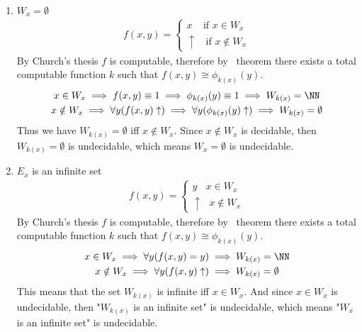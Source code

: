 \begin{enumerate}[label=\arabic*.]
    \item $W_x = \emptyset$
        \begin{gather*}
            f(x, y) = \begin{cases}
                x \ \ \ \ \ \text{if } x \in W_x \\
                \uparrow \ \ \ \ \text{if } x \notin W_x
            \end{cases}
        \end{gather*}
        By Church's thesis $f$ is computable, therefore by \smn\ theorem there exists a total computable function $k$ such that $f(x, y) \cong \phi_{k(x)}(y)$.
        \begin{gather*}
            x \in W_x \implies f(x, y) \equiv 1 \implies \phi_{k(x)}(y) \equiv 1 \implies W_{k(x)} = \NN \\
            x \notin W_x \implies \forall y (f(x, y) \uparrow) \implies \forall y (\phi_{k(x)}(y) \uparrow) \implies W_{k(x)} = \emptyset
        \end{gather*}
        Thus we have $W_{k(x)} = \emptyset$ iff $x \notin W_x$. Since $x \notin W_x$ is decidable, then $W_{k(x)} = \emptyset$ is undecidable, which means $W_x = \emptyset$ is undecidable.
    
    \item $E_x$ is an infinite set
        \begin{gather*}
            f(x, y) = \begin{cases}
                y \ \ \ \ x \in W_x \\
                \uparrow \ \ \ x \notin W_x
            \end{cases}
        \end{gather*}
        By Church's thesis $f$ is computable, therefore by \smn\ theorem there exists a total computable function $k$ such that $f(x, y) \cong \phi_{k(x)}(y)$. 
        \begin{gather*}
            x \in W_x \implies \forall y (f(x, y) = y) \implies W_{k(x)} = \NN \\
            x \notin W_x \implies \forall y(f(x, y) \uparrow) \implies W_{k(x)} = \emptyset
        \end{gather*}
        This means that the set $W_{k(x)}$ is infinite iff $x \in W_x$. And since $x \in W_x$ is undecidable, then "$W_{k(x)}$ is an infinite set" is undecidable, which means "$W_x$ is an infinite set" is undecidable.


\end{enumerate}
